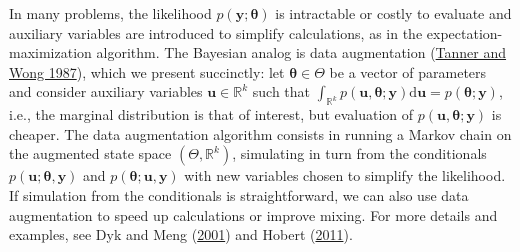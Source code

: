 \documentclass[
  11pt,
  letterpaper,
]{scrbook}
\theoremstyle{definition}
\theoremstyle{definition}
\theoremstyle{definition}
\theoremstyle{plain}
\theoremstyle{remark}
\begin{document}
In many problems, the likelihood
\(p(\boldsymbol{y}; \boldsymbol{\theta})\) is intractable or costly to
evaluate and auxiliary variables are introduced to simplify
calculations, as in the expectation-maximization algorithm. The Bayesian
analog is data augmentation
(\protect\hyperlink{ref-Tanner.Wong:1987}{Tanner and Wong 1987}), which
we present succinctly: let \(\boldsymbol{\theta} \in \Theta\) be a
vector of parameters and consider auxiliary variables
\(\boldsymbol{u} \in \mathbb{R}^k\) such that
\(\int_{\mathbb{R}^k} p(\boldsymbol{u}, \boldsymbol{\theta}; \boldsymbol{y}) \mathrm{d} \boldsymbol{u} = p(\boldsymbol{\theta}; \boldsymbol{y})\),
i.e., the marginal distribution is that of interest, but evaluation of
\(p(\boldsymbol{u}, \boldsymbol{\theta}; \boldsymbol{y})\) is cheaper.
The data augmentation algorithm consists in running a Markov chain on
the augmented state space \((\Theta, \mathbb{R}^k)\), simulating in turn
from the conditionals
\(p(\boldsymbol{u}; \boldsymbol{\theta}, \boldsymbol{y})\) and
\(p(\boldsymbol{\theta}; \boldsymbol{u}, \boldsymbol{y})\) with new
variables chosen to simplify the likelihood. If simulation from the
conditionals is straightforward, we can also use data augmentation to
speed up calculations or improve mixing. For more details and examples,
see Dyk and Meng (\protect\hyperlink{ref-vanDyk.Meng:2001}{2001}) and
Hobert (\protect\hyperlink{ref-Hobert:2011}{2011}).
\end{document}
